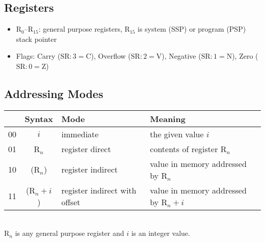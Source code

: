 \documentclass[12pt,english]{book}
\begin{document}
\subsection*{Registers}
\begin{itemize}[noitemsep,topsep=0pt]
\item \(\text{R}_0\)--\(\text{R}_{15}\): general purpose registers,
  \(\text{R}_{15}\) is system (SSP) or program (PSP) stack pointer
\item Flags: 
  Carry (\(\text{SR}{:}3=\text{C}\)),
  Overflow (\(\text{SR}{:}2=\text{V}\)),
  Negative (\(\text{SR}{:}1=\text{N}\)),
  Zero (\(\text{SR}{:}0=\text{Z}\))
\end{itemize}\nointerlineskip

\subsection*{Addressing Modes}
\begin{center}
\begin{tabular}{ccll}
  \toprule
  &Syntax&Mode&Meaning\\
  \midrule
  00&\(i\)&immediate&the given value \(i\)\\
  01&R\({}_n\)&register direct&contents of register R\({}_n\)\\
  10&(R\({}_n\))&register indirect&value in memory
  addressed by R\({}_n\)\\
  11&(R\({}_n+i\))&register indirect with offset
  &value in memory addressed by R\({}_n+i\)\\
  \bottomrule
\end{tabular}\\
R\({}_n\) is any general purpose register
and \(i\) is an integer value.
\end{center}
\end{document}
